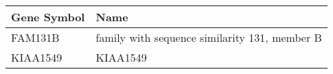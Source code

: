 \begin{tabular}{ll}
\toprule
Gene Symbol &                                          Name \\
\midrule
    FAM131B & family with sequence similarity 131, member B \\
   KIAA1549 &                                      KIAA1549 \\
\bottomrule
\end{tabular}
